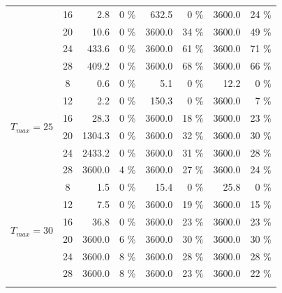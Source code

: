 \begin{table}
\begin{tabular}{|c|c|r r|r r|r r|}
             & 16 & 2.8 & 0 \% & 632.5 & 0 \% & \cellcolor{red!20}3600.0 &\cellcolor{red!20} 24 \% \\ 
             & 20 & 10.6 & 0 \% & \cellcolor{red!20}3600.0 & \cellcolor{red!20}34 \% & \cellcolor{red!20}3600.0 &\cellcolor{red!20} 49 \% \\ 
             & 24 & 433.6 & 0 \% & \cellcolor{red!20}3600.0 &\cellcolor{red!20} 61 \% & \cellcolor{red!20}3600.0 &\cellcolor{red!20} 71 \% \\ 
             & 28 & 409.2 & 0 \% & \cellcolor{red!20}3600.0 & \cellcolor{red!20}68 \% & \cellcolor{red!20}3600.0 &\cellcolor{red!20} 66 \% \\ \hline
            \multirow{6}{*}{$T_{max} = 25$} & 8 & 0.6 & 0 \% & 5.1 & 0 \% & 12.2 & 0 \% \\ 
             & 12 & 2.2 & 0 \% & 150.3 & 0 \% & \cellcolor{red!20}3600.0 &\cellcolor{red!20} 7 \% \\ 
             & 16 & 28.3 & 0 \% & \cellcolor{red!20}3600.0 & \cellcolor{red!20}18 \% & \cellcolor{red!20}3600.0 & \cellcolor{red!20}23 \% \\ 
             & 20 & 1304.3 & 0 \% & \cellcolor{red!20}3600.0 & \cellcolor{red!20}32 \% &\cellcolor{red!20} 3600.0 & \cellcolor{red!20}30 \% \\ 
             & 24 & 2433.2 & 0 \% &\cellcolor{red!20} 3600.0 & \cellcolor{red!20}31 \% & \cellcolor{red!20}3600.0 & \cellcolor{red!20}28 \% \\ 
             & 28 &\cellcolor{red!20} 3600.0 & \cellcolor{red!20}4 \% & \cellcolor{red!20}3600.0 &\cellcolor{red!20} 27 \% &\cellcolor{red!20} 3600.0 & \cellcolor{red!20}24 \% \\ \hline
            \multirow{6}{*}{$T_{max} = 30$} & 8 & 1.5 & 0 \% & 15.4 & 0 \% & 25.8 & 0 \% \\ 
             & 12 & 7.5 & 0 \% & \cellcolor{red!20}3600.0 &\cellcolor{red!20} 19 \% & \cellcolor{red!20}3600.0 & \cellcolor{red!20}15 \% \\ 
             & 16 & 36.8 & 0 \% &\cellcolor{red!20} 3600.0 & \cellcolor{red!20}23 \% &\cellcolor{red!20} 3600.0 & \cellcolor{red!20}23 \% \\ 
             & 20 &\cellcolor{red!20} 3600.0 & \cellcolor{red!20}6 \% & \cellcolor{red!20}3600.0 & \cellcolor{red!20}30 \% & \cellcolor{red!20}3600.0 & \cellcolor{red!20}30 \% \\ 
             & 24 & \cellcolor{red!20}3600.0 & \cellcolor{red!20}8 \% & \cellcolor{red!20}3600.0 &\cellcolor{red!20}28 \% & \cellcolor{red!20}3600.0 & \cellcolor{red!20}28 \% \\ 
             & 28 & \cellcolor{red!20}3600.0 & \cellcolor{red!20}8 \% &\cellcolor{red!20} 3600.0 & \cellcolor{red!20}23 \% & \cellcolor{red!20}3600.0 & \cellcolor{red!20}22 \% \\ 
             \thickhline
        \end{tabular}
    \endgroup
    \label{size_of_solvable_instances}
\end{table}

